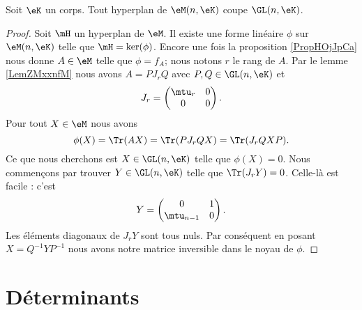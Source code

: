 \begin{corollary}       \label{CorICUOooPsZQrg}
    Soit \( \eK\) un corps. Tout hyperplan de \( \eM(n,\eK)\) coupe \( \GL(n,\eK)\).
\end{corollary}

\begin{proof}
    Soit \( \mH\) un hyperplan de \( \eM\). Il existe une forme linéaire \( \phi\) sur \( \eM(n,\eK)\) telle que \( \mH=\ker(\phi)\). Encore une fois la proposition \ref{PropHOjJpCa} nous donne \( A\in \eM\) telle que \( \phi=f_A\); nous notons \( r\) le rang de \( A\). Par le lemme \ref{LemZMxxnfM} nous avons \( A=PJ_rQ\) avec \( P,Q\in \GL(n,\eK)\) et
    \begin{equation}
        J_r=\begin{pmatrix}
            \mtu_r    &   0    \\ 
            0    &   0    
        \end{pmatrix}.
    \end{equation}
    Pour tout \( X\in \eM\) nous avons
    \begin{equation}
        \phi(X)=\Tr(AX)=\Tr(PJ_rQX)=\Tr(J_rQXP).
    \end{equation}
    Ce que nous cherchons est \( X\in \GL(n,\eK)\) telle que \( \phi(X)=0\). Nous commençons par trouver \( Y\in\GL(n,\eK)\) telle que \( \Tr(J_rY)=0\). Celle-là est facile : c'est
    \begin{equation}
        Y=\begin{pmatrix}
            0    &   1    \\ 
            \mtu_{n-1}    &   0    
        \end{pmatrix}.
    \end{equation}
    Les éléments diagonaux de \( J_rY\) sont tous nuls. Par conséquent en posant \( X=Q^{-1}YP^{-1}\) nous avons notre matrice inversible dans le noyau de \( \phi\).
\end{proof}

\section{Déterminants}
\label{SecGYzHWs}

